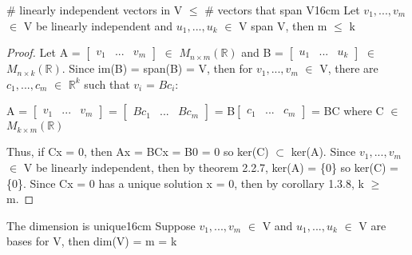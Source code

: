     \vspace{0.5cm}



    \begin{wtheorem}{\# linearly independent vectors in V $\leq$
    \# vectors that span V}{16cm}
        Let $v_1,...,v_m$ $\in$ V be linearly independent
        and $u_1,...,u_k$ $\in$ V span V, then m $\leq$ k
    \end{wtheorem}

    \begin{proof}
        Let A =
        $\begin{bmatrix}
            v_1 & ... & v_m
        \end{bmatrix}$ $\in$ $M_{n \times m}(\mathbb{R})$
        and B =
        $\begin{bmatrix}
            u_1 & ... & u_k
        \end{bmatrix}$ $\in$ $M_{n \times k}(\mathbb{R})$.
        Since im(B) = span(B) = V, then for $v_1,...,v_m$ $\in$ V, there are
        $c_1,...,c_m$ $\in$ $\mathbb{R}^k$ such that $v_i$ = $Bc_i$:

        \hspace{0.5cm}
        A =
        $\begin{bmatrix}
            v_1 & ... & v_m
        \end{bmatrix}$ =
        $\begin{bmatrix}
            Bc_1 & ... & Bc_m
        \end{bmatrix}$ =
        B$\begin{bmatrix}
            c_1 & ... & c_m
        \end{bmatrix}$
        = BC
        \hspace{0.5cm}
        where C $\in$ $M_{k \times m}(\mathbb{R})$

        Thus, if Cx = 0, then Ax = BCx = B0 = 0 so ker(C) $\subset$ ker(A).
        Since $v_1,...,v_m$ $\in$ V be linearly independent, then by
        {\color{red} theorem 2.2.7}, ker(A) = \{0\} so ker(C) = \{0\}.
        Since Cx = 0 has a unique solution x = 0, then by
        {\color{orange} corollary 1.3.8}, k $\geq$ m.
    \end{proof}

    \vspace{0.5cm}



    \begin{corollary}{The dimension is unique}{16cm}
        Suppose $v_1,...,v_m$ $\in$ V and
        $u_1,...,u_k$ $\in$ V are bases for V, then dim(V) = m = k
    \end{corollary}

